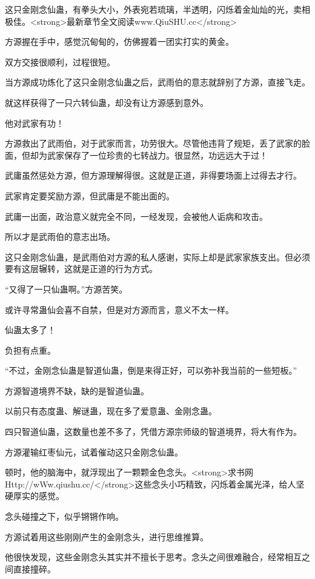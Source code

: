 
\begin{this_body}

这只金刚念仙蛊，有拳头大小，外表宛若琉璃，半透明，闪烁着金灿灿的光，卖相极佳。<strong>最新章节全文阅读www.QiuSHU.cc</strong>

方源握在手中，感觉沉甸甸的，仿佛握着一团实打实的黄金。

双方交接很顺利，过程很短。

当方源成功炼化了这只金刚念仙蛊之后，武雨伯的意志就辞别了方源，直接飞走。

就这样获得了一只六转仙蛊，却没有让方源感到意外。

他对武家有功！

方源救出了武雨伯，对于武家而言，功劳很大。尽管他违背了规矩，丢了武家的脸面，但却为武家保存了一位珍贵的七转战力。很显然，功远远大于过！

武庸虽然惩处方源，但方源理解得很。这就是正道，非得要场面上过得去才行。

武家肯定要奖励方源，但武庸是不能出面的。

武庸一出面，政治意义就完全不同，一经发现，会被他人诟病和攻击。

所以才是武雨伯的意志出场。

这只金刚念仙蛊，是武雨伯对方源的私人感谢，实际上却是武家家族支出。但必须要有这层辗转，这就是正道的行为方式。

“又得了一只仙蛊啊。”方源苦笑。

或许寻常蛊仙会喜不自禁，但是对方源而言，意义不太一样。

仙蛊太多了！

负担有点重。

“不过，金刚念仙蛊是智道仙蛊，倒是来得正好，可以弥补我当前的一些短板。”

方源智道境界不缺，缺的是智道仙蛊。

以前只有态度蛊、解谜蛊，现在多了爱意蛊、金刚念蛊。

四只智道仙蛊，这数量也差不多了，凭借方源宗师级的智道境界，将大有作为。

方源灌输红枣仙元，试着催动这只金刚念仙蛊。

顿时，他的脑海中，就浮现出了一颗颗金色念头。<strong>求书网Http://wWw.qiushu.cc/</strong>这些念头小巧精致，闪烁着金属光泽，给人坚硬厚实的感觉。

念头碰撞之下，似乎锵锵作响。

方源试着用这些刚刚产生的金刚念头，进行思维推算。

他很快发现，这些金刚念头其实并不擅长于思考。念头之间很难融合，经常相互之间直接撞碎。


\end{this_body}
